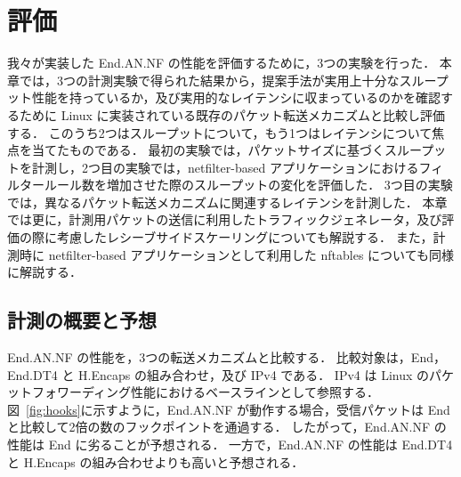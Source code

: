 \chapter{評価}
\label{chap:evaluation}

我々が実装した End.AN.NF の性能を評価するために，3つの実験を行った．
本章では，3つの計測実験で得られた結果から，提案手法が実用上十分なスループット性能を持っているか，及び実用的なレイテンシに収まっているのかを確認するために Linux に実装されている既存のパケット転送メカニズムと比較し評価する．
このうち2つはスループットについて，もう1つはレイテンシについて焦点を当てたものである．
最初の実験では，パケットサイズに基づくスループットを計測し，2つ目の実験では，netfilter-based アプリケーションにおけるフィルタールール数を増加させた際のスループットの変化を評価した．
3つ目の実験では，異なるパケット転送メカニズムに関連するレイテンシを計測した．
本章では更に，計測用パケットの送信に利用したトラフィックジェネレータ，及び評価の際に考慮したレシーブサイドスケーリングについても解説する．
また，計測時に netfilter-based アプリケーションとして利用した nftables についても同様に解説する．

\section{計測の概要と予想}
\label{sec:eval-prediction}
End.AN.NF の性能を，3つの転送メカニズムと比較する．
比較対象は，End，End.DT4 と H.Encaps の組み合わせ，及び IPv4 である．
IPv4 は Linux のパケットフォワーディング性能におけるベースラインとして参照する．
図~\ref*{fig:hooks}に示すように，End.AN.NF が動作する場合，受信パケットは End と比較して2倍の数のフックポイントを通過する．
したがって，End.AN.NF の性能は End に劣ることが予想される．
一方で，End.AN.NF の性能は End.DT4 と H.Encaps の組み合わせよりも高いと予想される．

